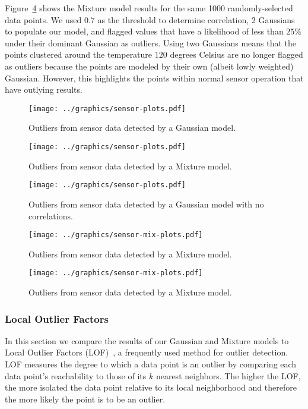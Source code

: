 Figure~\ref{fig:sensors_3} shows the Mixture model results for the same 1000 randomly-selected data points. 
We used $0.7$ as the threshold to determine correlation, 2 Gaussians to populate our model, and flagged values that have a likelihood of less than $25\%$ under their dominant Gaussian as outliers.
Using two Gaussians means that the points clustered around the temperature $120$ degrees Celsius are no longer flagged as outliers because the points are modeled by their own (albeit lowly weighted) Gaussian.
However, this highlights the points within normal sensor operation that have outlying results.
 

\begin{figure}[h]
\centering
\texttt{[image: ../graphics/sensor-plots.pdf]}
\caption{Outliers from sensor data detected by a Gaussian model.}
\label{fig:sensors_1}
\end{figure}
\begin{figure}[h]
\centering
\texttt{[image: ../graphics/sensor-plots.pdf]}
\caption{Outliers from sensor data detected by a Mixture model.}
\label{fig:sensors_2}
\end{figure}
\begin{figure}[h]
\centering
\texttt{[image: ../graphics/sensor-plots.pdf]}
\caption{Outliers from sensor data detected by a Gaussian model with no correlations.}
\label{fig:sensors_nocorr}
\end{figure}
\begin{figure}[h]
\centering
\texttt{[image: ../graphics/sensor-mix-plots.pdf]}
\caption{Outliers from sensor data detected by a Mixture model.}
\label{fig:sensors_3}
\end{figure}
\begin{figure}[h]
\centering
\texttt{[image: ../graphics/sensor-mix-plots.pdf]}
\caption{Outliers from sensor data detected by a Mixture model.}
\label{fig:sensors_4}
\end{figure}

\subsubsection{Local Outlier Factors}
\label{sec:lof-evaluation}

In this section we compare the results of our Gaussian and Mixture models to Local Outlier Factors (LOF)~\cite{Breunig2000}, a frequently used method for outlier detection.
LOF measures the degree to which a data point is an outlier by comparing each data point's reachability to those of its $k$ nearest neighbors.
The higher the LOF, the more isolated the data point relative to its local neighborhood and therefore the more likely the point is to be an outlier.

